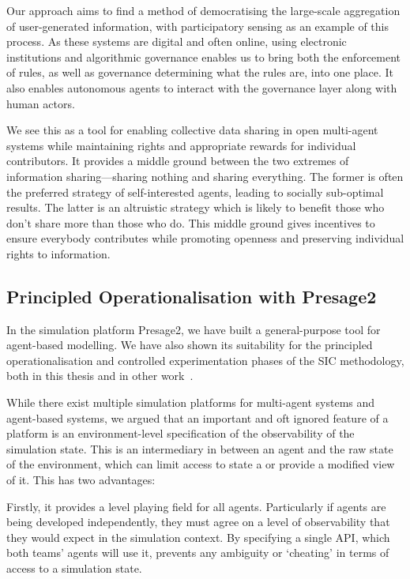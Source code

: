 Our approach aims to find a method of democratising the large-scale
aggregation of user-generated information, with participatory sensing as an
example of this process. As these systems are digital and often online, using
electronic institutions and algorithmic governance enables us to bring both
the enforcement of rules, as well as governance determining what the rules
are, into one place. It also enables autonomous agents to interact with the
governance layer along with human actors.

We see this as a tool for enabling collective data sharing in open multi-agent
systems while maintaining rights and appropriate rewards for individual
contributors. It provides a middle ground between the two extremes of
information sharing---sharing nothing and sharing everything. The former is
often the preferred strategy of self-interested agents, leading to socially
sub-optimal results. The latter is an altruistic strategy which is likely to
benefit those who don't share more than those who do. This middle ground gives
incentives to ensure everybody contributes while promoting openness and preserving individual rights to information.

\subsection{Principled Operationalisation with Presage2}

In the simulation platform Presage2, we have built a general-purpose tool for
agent-based modelling. We have also shown its suitability for the
principled operationalisation and controlled experimentation phases of the
\ac{SIC} methodology, both in this thesis and in other
work~\citep{Macbeth2014}.

While there exist multiple simulation platforms for multi-agent systems and
agent-based systems, we argued that an important and oft ignored feature of
a platform is an environment-level specification of the observability of the
simulation state. This is an intermediary in between an agent and the raw
state of the environment, which can limit access to state a or provide a modified view of it.
This has two advantages:

Firstly, it provides a level playing field for all agents. Particularly if
agents are being developed independently, they must agree on a level of
observability that they would expect in the simulation context. By specifying a
single \ac{API}, which both teams' agents will use it, prevents any ambiguity
or `cheating' in terms of access to a simulation state.

